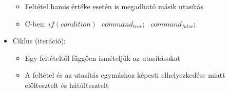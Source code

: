 \documentclass[12pt,a4paper]{article}
\begin{document}
\begin{tcolorbox}[colback=blue!5!white,colframe=blue!50!black,title= 16. Ismertesse az alapvető algoritmus-elemeket a Böhm-Jacopini tétel alapján!]
\begin{itemize}
\begin{itemize}
                        \item Feltétel hamis értéke esetén is megadható másik utasítás 
                        \item C-ben: \(if (condition)\hspace{8pt} command_{true} ;\hspace{8pt} command_{false};\)
                        \begin{center}
                        \end{center}
                    \end{itemize}
                    \item Ciklus (iteráció):
                    \begin{itemize}
                        \item Egy feltételtől függően ismételjük az utasításokat
                        \item A feltétel és az utasítás egymáshoz képesti elhelyezkedése miatt előltesztelt és hátúltesztelt
                    \end{itemize}
                    \begin{center}
                    \end{center}
                \end{itemize}
            \end{tcolorbox}
            
\end{document}
